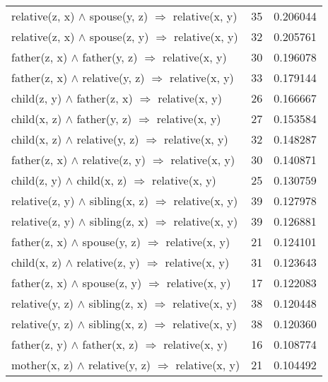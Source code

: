 \begin{longtable}{lrr}
  relative(z, x) $\wedge$ spouse(y, z)   $\Rightarrow$ relative(x, y) &           35 &        0.206044 \\
  relative(z, x) $\wedge$ spouse(z, y)   $\Rightarrow$ relative(x, y) &           32 &        0.205761 \\
    father(z, x) $\wedge$ father(y, z)   $\Rightarrow$ relative(x, y) &           30 &        0.196078 \\
  father(z, x) $\wedge$ relative(y, z)   $\Rightarrow$ relative(x, y) &           33 &        0.179144 \\
     child(z, y) $\wedge$ father(z, x)   $\Rightarrow$ relative(x, y) &           26 &        0.166667 \\
     child(x, z) $\wedge$ father(y, z)   $\Rightarrow$ relative(x, y) &           27 &        0.153584 \\
   child(x, z) $\wedge$ relative(y, z)   $\Rightarrow$ relative(x, y) &           32 &        0.148287 \\
  father(z, x) $\wedge$ relative(z, y)   $\Rightarrow$ relative(x, y) &           30 &        0.140871 \\
      child(z, y) $\wedge$ child(x, z)   $\Rightarrow$ relative(x, y) &           25 &        0.130759 \\
 relative(z, y) $\wedge$ sibling(x, z)   $\Rightarrow$ relative(x, y) &           39 &        0.127978 \\
 relative(z, y) $\wedge$ sibling(z, x)   $\Rightarrow$ relative(x, y) &           39 &        0.126881 \\
    father(z, x) $\wedge$ spouse(y, z)   $\Rightarrow$ relative(x, y) &           21 &        0.124101 \\
   child(x, z) $\wedge$ relative(z, y)   $\Rightarrow$ relative(x, y) &           31 &        0.123643 \\
    father(z, x) $\wedge$ spouse(z, y)   $\Rightarrow$ relative(x, y) &           17 &        0.122083 \\
 relative(y, z) $\wedge$ sibling(z, x)   $\Rightarrow$ relative(x, y) &           38 &        0.120448 \\
 relative(y, z) $\wedge$ sibling(x, z)   $\Rightarrow$ relative(x, y) &           38 &        0.120360 \\
    father(z, y) $\wedge$ father(x, z)   $\Rightarrow$ relative(x, y) &           16 &        0.108774 \\
  mother(x, z) $\wedge$ relative(y, z)   $\Rightarrow$ relative(x, y) &           21 &        0.104492 \\

\end{longtable}
